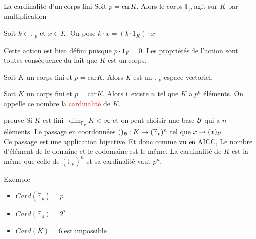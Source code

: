 \begin{parag}{La cardinalité d'un corps fini}
    Soit $p = \text{car}K$. Alors le corps $\mathbb{F}_p$ agit sur $K$ par multiplication
    \begin{definition}
        Soit $k \in \mathbb{F}_p$ et $x \in K$. On pose $k \cdot x = (k\cdot 1_K)\cdot x$
    \end{definition}
    Cette action est bien défini puisque $p\cdot 1_K = 0$. Les propriétés de l'action sont toutes conséquence du fait que $K$ est un corps.
    \begin{proposition}
        Soit $K$ un corps fini et $p = \text{car}K$. Alors $K$ est un $\mathbb{F}_p$-espace vectoriel.
    \end{proposition}
    \begin{theoreme}
        Soit $K$ un corps fini et $p = $car$K$. Alors il existe $n$ tel que $K$ a $p^n$ éléments. On appelle ce nombre la \textcolor{red}{cardinalité} de $K$. 
    \end{theoreme}
    \begin{subparag}{preuve}
        Si $K$ est fini, $\dim_{\mathbb{F}_p}K < \infty$ et on peut choisir une base $\mathcal{B}$ qui a $n$ éléments. Le passage en coordonnées $()_{\mathcal{B}} : K \to (\mathbb{F}_p)^n$ tel que $x \to (x)_{\mathcal{B}}$
        \\
        Ce passage est une application bijective. Et donc comme vu en AICC, Le nombre d'élément de le domaine et le codomaine est le même. La cardinalité de $K$ est la même que celle de $(\mathbb{F}_p)^n$ et sa cardinalité vaut $p^n$.
    \end{subparag}
    \begin{subparag}{Exemple}
        \begin{itemize}
            \item $Card(\mathbb{F}_p) = p$
            \item  $Card(\mathbb{F}_4) = 2^2$
            \item $Card(K) = 6$ est impossible
        \end{itemize}
    \end{subparag}
\end{parag}

